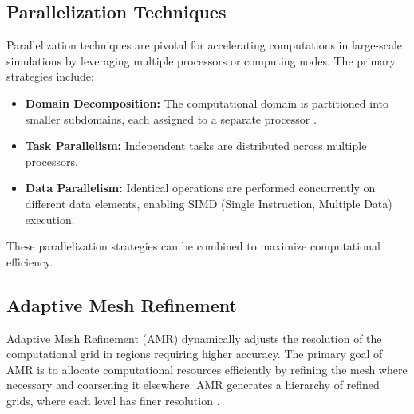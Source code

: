 \subsection{Parallelization Techniques}

Parallelization techniques are pivotal for accelerating computations in large-scale simulations by leveraging multiple processors or computing nodes. The primary strategies include:

\begin{itemize}
    \item \textbf{Domain Decomposition:} The computational domain is partitioned into smaller subdomains, each assigned to a separate processor \citep{1986Natur.324..446B}.
    \item \textbf{Task Parallelism:} Independent tasks are distributed across multiple processors.
    \item \textbf{Data Parallelism:} Identical operations are performed concurrently on different data elements, enabling SIMD (Single Instruction, Multiple Data) execution.
\end{itemize}

These parallelization strategies can be combined to maximize computational efficiency.

\subsection{Adaptive Mesh Refinement}

Adaptive Mesh Refinement (AMR) dynamically adjusts the resolution of the computational grid in regions requiring higher accuracy. The primary goal of AMR is to allocate computational resources efficiently by refining the mesh where necessary and coarsening it elsewhere. AMR generates a hierarchy of refined grids, where each level has finer resolution \citep{1989JCoPh..82...64B}.

